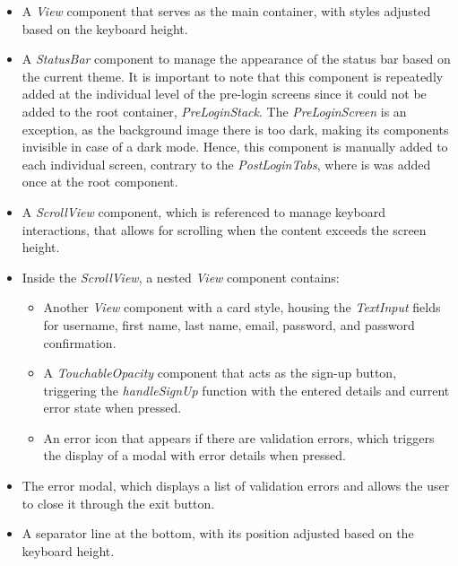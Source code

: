 \begin{itemize}
    \item A \textit{View} component that serves as the main container, with styles adjusted based on the keyboard height. 
    \item A \textit{StatusBar} component to manage the appearance of the status bar based on the current theme. It is important to note that this component is repeatedly added at the individual level of the pre-login screens since it could not be added to the root container, \textit{PreLoginStack}. The \textit{PreLoginScreen} is an exception, as the background image there is too dark, making its components invisible in case of a dark mode. Hence, this component is manually added to each individual screen, contrary to the \textit{PostLoginTabs}, where is was added once at the root component.
    \item A \textit{ScrollView} component, which is referenced to manage keyboard interactions, that allows for scrolling when the content exceeds the screen height. 
    \item Inside the \textit{ScrollView}, a nested \textit{View} component contains:
    \begin{itemize}
        \item Another \textit{View} component with a card style, housing the \textit{TextInput} fields for username, first name, last name, email, password, and password confirmation.
        \item A \textit{TouchableOpacity} component that acts as the sign-up button, triggering the \textit{handleSignUp} function with the entered details and current error state when pressed.
        \item An error icon that appears if there are validation errors, which triggers the display of a modal with error details when pressed.
    \end{itemize}
    \item The error modal, which displays a list of validation errors and allows the user to close it through the exit button.
    \item A separator line at the bottom, with its position adjusted based on the keyboard height.
\end{itemize}


